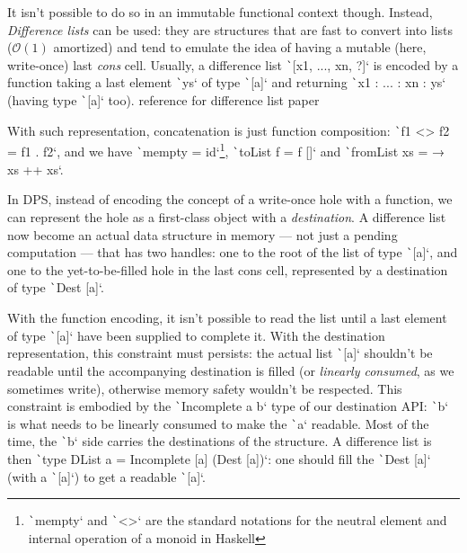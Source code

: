 \documentclass[english]{jflart}
\newcommand{\TODO}[1]{{\color{red}\large #1}}
\begin{document}
It isn't possible to do so in an immutable functional context though. Instead, \emph{Difference lists} can be used: they are structures that are fast to convert into lists ($\mathcal{O}(1)$ amortized) and tend to emulate the idea of having a mutable (here, write-once) last \emph{cons} cell. Usually, a difference list \texttt`[x1, ..., xn, ?]` is encoded by a function taking a last element \texttt`ys` of type \texttt`[a]` and returning \texttt`x1 : ... : xn : ys` (having type \texttt`[a]` too). \TODO{reference for difference list paper}

With such representation, concatenation is just function composition: \texttt`f1 <> f2 = f1 . f2`, and we have \texttt`mempty = id`\footnote{\texttt`mempty` and \texttt`<>` are the standard notations for the neutral element and internal operation of a monoid in Haskell}, \texttt`toList f = f []` and \texttt`fromList xs = \ys → xs ++ xs`.

In DPS, instead of encoding the concept of a write-once hole with a function, we can represent the hole as a first-class object with a \emph{destination}. A difference list now become an actual data structure in memory --- not just a pending computation --- that has two handles: one to the root of the list of type \texttt`[a]`, and one to the yet-to-be-filled hole in the last cons cell, represented by a destination of type \texttt`Dest [a]`.

With the function encoding, it isn't possible to read the list until a last element of type \texttt`[a]` have been supplied to complete it. With the destination representation, this constraint must persists: the actual list \texttt`[a]` shouldn't be readable until the accompanying destination is filled (or \emph{linearly consumed}, as we sometimes write), otherwise memory safety wouldn't be respected. This constraint is embodied by the \texttt`Incomplete a b` type of our destination API: \texttt`b` is what needs to be linearly consumed to make the \texttt`a` readable. Most of the time, the \texttt`b` side carries the destinations of the structure. A difference list is then \texttt`type DList a = Incomplete [a] (Dest [a])`: one should fill the \texttt`Dest [a]` (with a \texttt`[a]`) to get a readable \texttt`[a]`.
\end{document}
